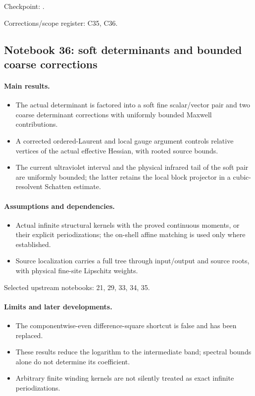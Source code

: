 \documentclass[11pt]{article}
\theoremstyle{remark}
\begin{document}
Checkpoint: .\par
Corrections/scope register: C35, C36.\par

\subsection{Notebook 36: soft determinants and bounded coarse corrections}
\label{hnc-36}
\noindent{}\par

\paragraph{Main results.}
\begin{itemize}
\item The actual determinant is factored into a soft fine scalar/vector pair and two coarse determinant corrections with uniformly bounded Maxwell contributions.
\item A corrected ordered-Laurent and local gauge argument controls relative vertices of the actual effective Hessian, with rooted source bounds.
\item The current ultraviolet interval and the physical infrared tail of the soft pair are uniformly bounded; the latter retains the local block projector in a cubic-resolvent Schatten estimate.
\end{itemize}

\paragraph{Assumptions and dependencies.}
\begin{itemize}
\item Actual infinite structural kernels with the proved continuous moments, or their explicit periodizations; the on-shell affine matching is used only where established.
\item Source localization carries a full tree through input/output and source roots, with physical fine-site Lipschitz weights.
\end{itemize}

Selected upstream notebooks: 21, 29, 33, 34, 35.\par

\paragraph{Limits and later developments.}
\begin{itemize}
\item The componentwise-even difference-square shortcut is false and has been replaced.
\item These results reduce the logarithm to the intermediate band; spectral bounds alone do not determine its coefficient.
\item Arbitrary finite winding kernels are not silently treated as exact infinite periodizations.
\end{itemize}
\end{document}
